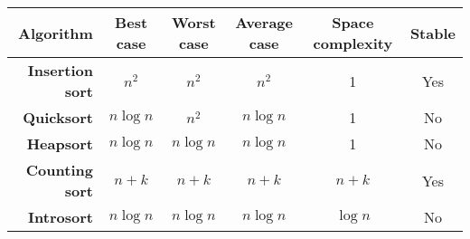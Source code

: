 \begin{tabular}{rccccc}
\hline
    \textbf{Algorithm}   &   \textbf{Best case} &   \textbf{Worst case} &   \textbf{Average case} &   \textbf{Space complexity} &   \textbf{Stable}  \\
\hline
 \textbf{Insertion sort} &          $n^{2}$ &	$n^{2}$ &	$n^{2}$	 & 1	& Yes \\
      \textbf{Quicksort} &          $n\log n$ &    $n^{2}$       &         $n\log n$ &          1 &           No \\
       \textbf{Heapsort} &          $n\log n$ &         $n\log n$ &          $n\log n$&          1 &           No \\
  \textbf{Counting sort} &          $n+k$ &          $n+k$ &          $n+k$ &          $n+k$ &          Yes \\
      \textbf{Introsort} &          $n\log n$ &          $n\log n$&          $n\log n$ &          $\log n$ &          No\\
\hline
\end{tabular}